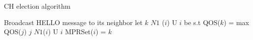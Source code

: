 \documentclass[11pt]{article}
\begin{document}
\begin{algorithm}
\caption{CH election algorithm}
\label{CHalgorithm}
\begin{algorithmic}[1]
\State Broadcast HELLO message to its neighbor
\State let $k$  $N1$ ($i$) U {$i$} be s.t
\State QOS($k$) = max {QOS($j$) \textbar $j$  $N1$($i$)  U $i$}
\State MPRSet($i$) = $k$
\EndFor
\EndProcedure
\end{algorithmic}
\end{algorithm}
\end{document}

